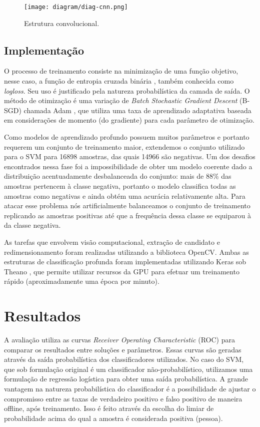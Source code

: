         \begin{figure}
        \centering
        \texttt{[image: diagram/diag-cnn.png]}
        \caption{Estrutura convolucional.}
        \label{fig:diag-cnn}
        \end{figure}

    \subsection{Implementação}
        O processo de treinamento consiste na minimização de uma função objetivo, nesse caso, a função de entropia cruzada binária \cite{DLbook}, também conhecida como \textit{logloss}. Seu uso é justificado pela natureza probabilística da camada de saída. O método de otimização é uma variação de \textit{Batch Stochastic Gradient Descent} (B-SGD) chamada Adam \cite{kingma2014adam}, que utiliza uma taxa de aprendizado adaptativa baseada em considerações de momento (do gradiente) para cada parâmetro de otimização.


        Como modelos de aprendizado profundo possuem muitos parâmetros e portanto requerem um conjunto de treinamento maior, extendemos o conjunto utilizado para o SVM para 16898 amostras, das quais 14966 são negativas. Um dos desafios encontrados nessa fase foi a impossibilidade de obter um modelo coerente dado a distribuição acentuadamente desbalanceada do conjunto: mais de 88\% das amostras pertencem à classe negativa, portanto o modelo classifica todas as amostras como negativas e ainda obtém uma acurácia relativamente alta. Para atacar esse problema nós artificialmente balanceamos o conjunto de treinamento replicando as amostras positivas até que a frequência dessa classe se equiparou à da classe negativa.

        As tarefas que envolvem visão computacional, extração de candidato e redimensionamento foram realizadas utilizando a biblioteca OpenCV. Ambas as estruturas de classificação profunda foram implementadas utilizando Keras \cite{keras} sob Theano \cite{theano}, que permite utilizar recursos da GPU para efetuar um treinamento rápido (aproximadamente uma época por minuto).

\section{Resultados}
\label{sec:results}

    A avaliação utiliza as curvas \textit{Receiver Operating Characteristic} (ROC) \cite{evaluationMetrics} para comparar os resultados entre soluções e parâmetros. Essas curvas são geradas através da saída probabilística dos classificadores utilizados. No caso do SVM, que sob formulação original é um classificador não-probabilístico, utilizamos uma formulação de regressão logística \cite{svmProbabilisticOutput} para obter uma saída probabilística. A grande vantagem na natureza probabilística do classificador é a possibilidade de ajustar o compromisso entre as taxas de verdadeiro positivo e falso positivo de maneira offline, após treinamento. Isso é feito através da escolha do limiar de probabilidade acima do qual a amostra é considerada positiva (pessoa).

